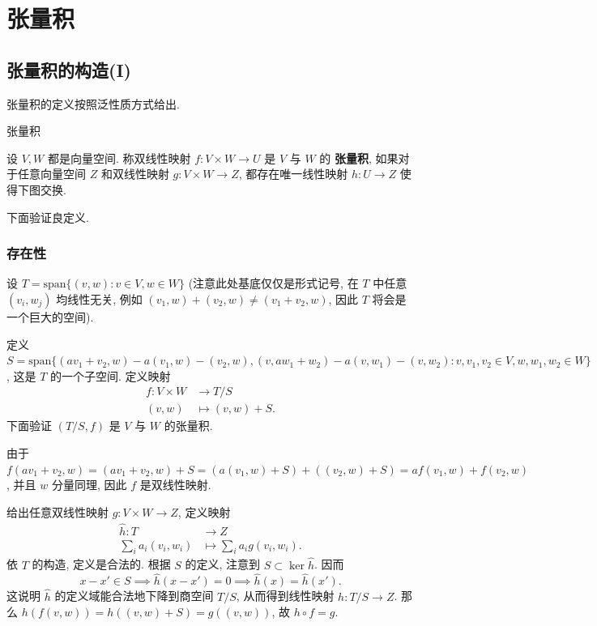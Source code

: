 \section{张量积}

\subsection{张量积的构造(I)}

张量积的定义按照泛性质方式给出.

\vspace{0.6em}
\begin{definition} 
    张量积

    设 $V,W$ 都是向量空间. 称双线性映射 $f: V \times W \to U$ 是 $V$ 与 $W$ 的 \textbf{张量积}, 如果对于任意向量空间 $Z$ 和双线性映射 $g: V \times W \to Z$, 都存在唯一线性映射 $h: U \to Z$ 使得下图交换.
    \begin{center}
    \end{center}
\end{definition}

下面验证良定义.

\subsubsection*{存在性}

设 $T=\text{span}\{(v,w):v \in V,w \in W\}$ (注意此处基底仅仅是形式记号, 在 $T$ 中任意 $(v_i,w_j)$ 均线性无关, 例如 $(v_1,w)+(v_2,w)\ne (v_1+v_2,w)$, 因此 $T$ 将会是一个巨大的空间).

定义 $S=\text{span}\{(av_1+v_2,w)-a(v_1,w)-(v_2,w), (v,aw_1+w_2)-a(v,w_1)-(v,w_2):v,v_1,v_2 \in V,w,w_1,w_2 \in W\}$, 这是 $T$ 的一个子空间. 定义映射
\begin{align*}
    f: V \times W &\to T/S \\
    (v,w) &\mapsto (v,w) + S.
\end{align*}
下面验证 $(T/S,f)$ 是 $V$ 与 $W$ 的张量积.

由于 $f(av_1+v_2,w) = (av_1+v_2,w)+S = (a(v_1,w)+S) + ((v_2,w)+S) = af(v_1,w)+f(v_2,w)$, 并且 $w$ 分量同理, 因此 $f$ 是双线性映射. 

给出任意双线性映射 $g: V \times W \to Z$, 定义映射
\begin{align*}
    \hat{h}: T &\to Z \\
    \sum_{i} a_i(v_i,w_i) &\mapsto \sum_{i} a_i g(v_i,w_i).
\end{align*}
依 $T$ 的构造, 定义是合法的. 根据 $S$ 的定义, 注意到 $S \subset \ker{\hat{h}}$. 因而
\begin{equation*}
    x-x' \in S \implies \hat{h}(x-x') = 0 \implies \hat{h}(x) = \hat{h}(x').
\end{equation*}
这说明 $\hat{h}$ 的定义域能合法地下降到商空间 $T/S$, 从而得到线性映射 $h: T/S \to Z$. 那么 $h(f(v,w)) = h((v,w)+S) = g((v,w))$, 故 $h \circ f = g$.

